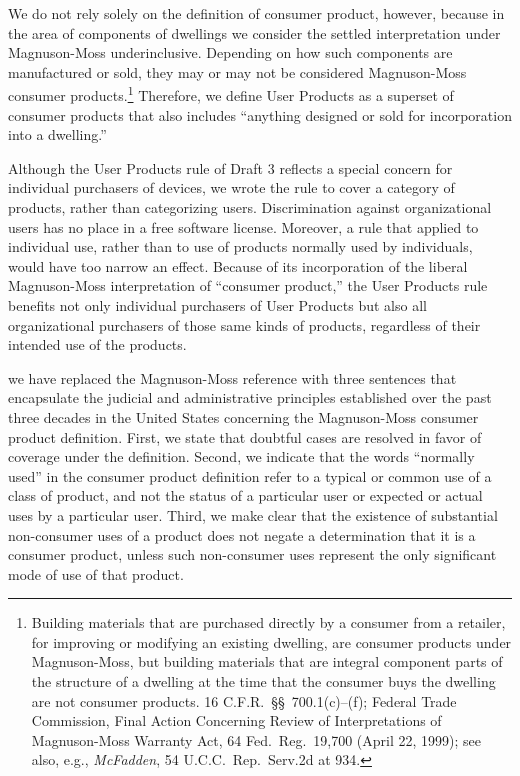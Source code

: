 We do not rely solely on the definition of consumer product, however,
because in the area of components of dwellings we consider the settled
interpretation under Magnuson-Moss underinclusive.  Depending on how
such components are manufactured or sold, they may or may not be
considered Magnuson-Moss consumer products.\footnote{Building materials
that are purchased directly by a consumer from a retailer, for improving
or modifying an existing dwelling, are consumer products under
Magnuson-Moss, but building materials that are integral component parts
of the structure of a dwelling at the time that the consumer buys the
dwelling are not consumer products. 16 C.F.R.~\S\S~700.1(c)--(f);
Federal Trade Commission, Final Action Concerning Review of
Interpretations of Magnuson-Moss Warranty Act, 64 Fed.~Reg.~19,700
(April 22, 1999); see also, e.g., \textit{McFadden}, 54
U.C.C.~Rep.~Serv.2d at 934.}  Therefore, we define User Products as a
superset of consumer products that also includes ``anything designed or
sold for incorporation into a dwelling.''

Although the User Products rule of Draft 3 reflects a special concern
for individual purchasers of devices, we wrote the rule to cover a
category of products, rather than categorizing users.  Discrimination
against organizational users has no place in a free software license.
Moreover, a rule that applied to individual use, rather than to use of
products normally used by individuals, would have too narrow an
effect. Because of its incorporation of the liberal Magnuson-Moss
interpretation of ``consumer product,'' the User Products rule benefits
not only individual purchasers of User Products but also all
organizational purchasers of those same kinds of products, regardless of
their intended use of the products.

we have replaced the Magnuson-Moss
reference with three sentences that encapsulate the judicial and
administrative principles established over the past three decades in the
United States concerning the Magnuson-Moss consumer product definition.
First, we state that doubtful cases are resolved in favor of coverage
under the definition.  Second, we indicate that the words ``normally
used'' in the consumer product definition refer to a typical or common
use of a class of product, and not the status of a particular user or
expected or actual uses by a particular user.  Third, we make clear that
the existence of substantial non-consumer uses of a product does not
negate a determination that it is a consumer product, unless such
non-consumer uses represent the only significant mode of use of that
product.

